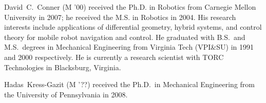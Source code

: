 \documentclass[journal,twoside]{IEEEtran}
\begin{document}
\vspace{-0.5in}

\begin{IEEEbiography}{David~C.~Conner} (M '00) received the
  Ph.D. in Robotics from Carnegie Mellon University in 2007; he
  received the M.S. in Robotics in 2004.  His research interests
  include applications of differential geometry, hybrid systems, and
  control theory for mobile robot navigation and control.  He
  graduated with B.S.\ and M.S.\ degrees in Mechanical Engineering
  from Virginia Tech (VPI\&SU) in 1991 and 2000 respectively.  He is
  currently a research scientist with TORC Technologies in Blacksburg,
  Virginia.
\end{IEEEbiography}

\vspace{-0.2in}

\begin{IEEEbiography}{Hadas~Kress-Gazit} (M '??) received the
  Ph.D.\ in Mechanical Engineering from the University of Pennsylvania
  in 2008.

\end{IEEEbiography}






\end{document}
